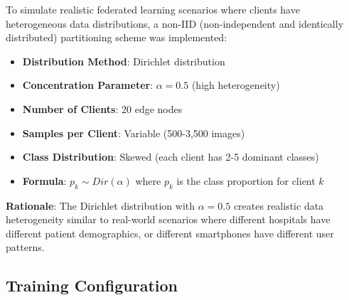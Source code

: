 \documentclass[12pt,a4paper]{article}
\begin{document}
To simulate realistic federated learning scenarios where clients have heterogeneous data distributions, a non-IID (non-independent and identically distributed) partitioning scheme was implemented:

\begin{itemize}
    \item \textbf{Distribution Method}: Dirichlet distribution
    \item \textbf{Concentration Parameter}: $\alpha = 0.5$ (high heterogeneity)
    \item \textbf{Number of Clients}: 20 edge nodes
    \item \textbf{Samples per Client}: Variable (500-3,500 images)
    \item \textbf{Class Distribution}: Skewed (each client has 2-5 dominant classes)
    \item \textbf{Formula}: $p_k \sim Dir(\alpha)$ where $p_k$ is the class proportion for client $k$
\end{itemize}

\textbf{Rationale}: The Dirichlet distribution with $\alpha = 0.5$ creates realistic data heterogeneity similar to real-world scenarios where different hospitals have different patient demographics, or different smartphones have different user patterns.

\subsection{Training Configuration}
\end{document}
